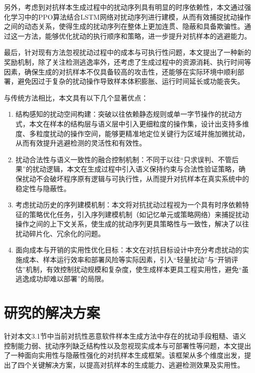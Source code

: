 另外，考虑到对抗样本生成过程中的扰动序列具有明显的时序依赖性，本文通过强化学习中的PPO算法结合LSTM网络对扰动序列进行建模，从而有效捕捉扰动操作之间的动态关系，使得生成的扰动序列在整体上更加连贯、隐蔽和具备欺骗性。通过这一方法，能够优化扰动的执行顺序和策略，进一步提升对抗样本的逃避能力。

最后，针对现有方法忽视扰动过程中的成本与可执行性问题，本文提出了一种新的奖励机制，除了关注检测逃逸率外，还考虑了生成过程中的资源消耗、执行时间等因素，确保生成的对抗样本不仅具备较高的攻击性，还能够在实际环境中顺利部署，避免因过于复杂的扰动操作导致样本体积膨胀、运行时间延长或功能丧失。

与传统方法相比，本文具有以下几个显著优点：

\begin{enumerate} [label=\arabic*)] 

\item 结构感知的扰动空间构建：突破以往依赖静态规则或单一字节操作的扰动方式，本文在样本的结构层与语义层中引入更细粒度的操作集，设计出支持多维度、多粒度扰动的操作空间，能够更精准地定位关键行为区域并施加微扰动，从而有效提升逃避检测的灵活性和有效性。

\item 扰动合法性与语义一致性的融合控制机制：不同于以往“只求误判、不管后果”的扰动逻辑，本文在生成过程中引入语义保持约束与合法性验证策略，确保扰动不会破坏程序原有逻辑与可执行性，从而提升对抗样本在真实系统中的稳定性与隐蔽性。

\item 考虑扰动历史的序列建模机制：本文将对抗扰动过程视为一个具有时序依赖特征的策略优化任务，引入序列建模机制（如记忆单元或策略网络）来捕捉扰动操作之间的上下文关系，使生成的扰动序列更具策略性与一致性，解决了以往扰动碎片化、冗余化的问题。

\item 面向成本与开销的实用性优化目标：本文在对抗目标设计中充分考虑扰动的实施成本、样本运行效率和部署风险等实际因素，引入“轻量扰动”与“开销评估”机制，有效控制扰动规模和复杂度，使生成样本更具工程实用性，避免“虽逃逸成功却难以部署”的局限。

\end{enumerate}

\section{研究的解决方案}

针对本文3.1节中当前对抗性恶意软件样本生成方法中存在的扰动手段粗糙、语义控制能力弱、扰动序列缺乏结构性以及忽视现实成本与可部署性等问题，本文提出了一种面向实用性与隐蔽性强化的对抗样本生成框架。该框架从多个维度出发，提出了四个关键解决方案，以提高对抗样本的生成能力、逃避检测效果及实用性。

